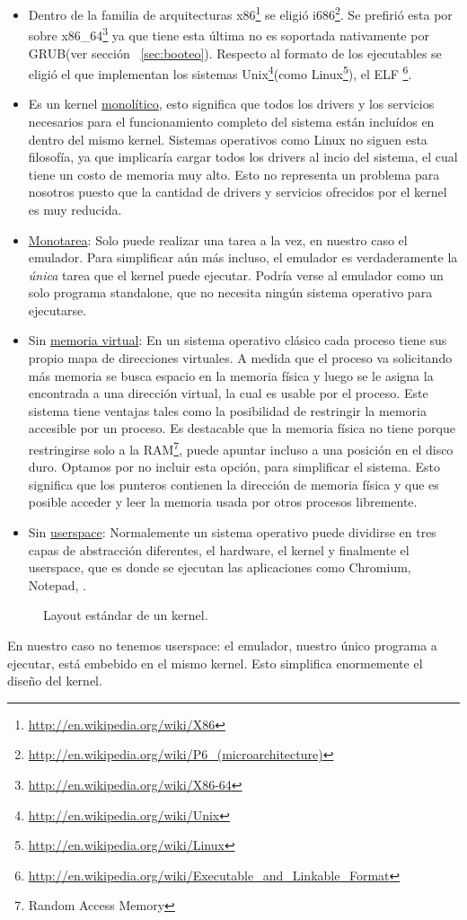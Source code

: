\begin{itemize}
\item Dentro de la familia de arquitecturas x86\footnote{\url{http://en.wikipedia.org/wiki/X86}} se eligió i686\footnote{\url{http://en.wikipedia.org/wiki/P6_(microarchitecture)}}. Se prefirió esta por sobre x86\_64\footnote{\url{http://en.wikipedia.org/wiki/X86-64}} ya que tiene esta última no es soportada nativamente por GRUB(ver sección ~\ref{sec:booteo}). Respecto al formato de los ejecutables se eligió el que implementan los sistemas Unix\footnote{\url{http://en.wikipedia.org/wiki/Unix}}(como Linux\footnote{\url{http://en.wikipedia.org/wiki/Linux}}), el ELF \footnote{\url{http://en.wikipedia.org/wiki/Executable_and_Linkable_Format}}.
\item Es un kernel \underline{monolítico}, esto significa que todos los drivers y los servicios necesarios para el funcionamiento completo del sistema están incluídos en dentro del mismo kernel. Sistemas operativos como Linux no siguen esta filosofía, ya que implicaría cargar todos los drivers al incio del sistema, el cual tiene un costo de memoria muy alto. Esto no representa un problema para nosotros puesto que la cantidad de drivers y servicios ofrecidos por el kernel es muy reducida.
\item \underline{Monotarea}: Solo puede realizar una tarea a la vez, en nuestro caso el emulador. Para simplificar aún más incluso, el emulador es verdaderamente la \emph{única} tarea que el kernel puede ejecutar. Podría verse al emulador como un solo programa standalone, que no necesita ningún sistema operativo para ejecutarse.
\item Sin \underline{memoria virtual}: En un sistema operativo clásico cada proceso tiene sus propio mapa de direcciones virtuales. A medida que el proceso va solicitando más memoria se busca espacio en la memoria física y luego se le asigna la encontrada a una dirección virtual, la cual es usable por el proceso. Este sistema tiene ventajas tales como la posibilidad de restringir la memoria accesible por un proceso. Es destacable que la memoria física no tiene porque restringirse solo a la RAM\footnote{Random Access Memory}, puede apuntar incluso a una posición en el disco duro. Optamos por no incluir esta opción, para simplificar el sistema. Esto significa que los punteros contienen la dirección de memoria física y que es posible acceder y leer la memoria usada por otros procesos libremente.
\item Sin \underline{userspace}: Normalemente un sistema operativo puede dividirse en tres capas de abstracción diferentes, el hardware, el kernel y finalmente el userspace, que es donde se ejecutan las aplicaciones como Chromium, Notepad, \etc.
\end{itemize}
\begin{figure}[h]
\centering
\def\svgwidth{5cm}

\caption{Layout estándar de un kernel.}
\end{figure}
\FloatBarrier
En nuestro caso no tenemos userspace: el emulador, nuestro único programa a ejecutar, está embebido en el mismo kernel. Esto simplifica enormemente el diseño del kernel.

